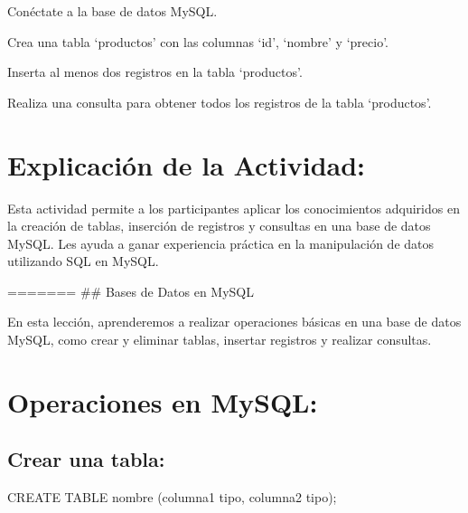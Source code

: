 \documentclass[
  a4paper,
  onepage,
  openany]{scrreprt}
\newenvironment{Shaded}{\begin{snugshade}}{\end{snugshade}}
\newcommand{\KeywordTok}[1]{\textcolor[rgb]{0.00,0.23,0.31}{#1}}
\newcommand{\NormalTok}[1]{\textcolor[rgb]{0.00,0.23,0.31}{#1}}
\begin{document}
\begin{tcolorbox}[enhanced jigsaw, breakable, opacityback=0, toptitle=1mm, coltitle=black, toprule=.15mm, rightrule=.15mm, colframe=quarto-callout-important-color-frame, opacitybacktitle=0.6, arc=.35mm, title=\textcolor{quarto-callout-important-color}{\faExclamation}\hspace{0.5em}{Actividad Práctica:}, titlerule=0mm, colbacktitle=quarto-callout-important-color!10!white, bottomtitle=1mm, bottomrule=.15mm, colback=white, left=2mm, leftrule=.75mm]

Conéctate a la base de datos MySQL.

Crea una tabla `productos' con las columnas `id', `nombre' y `precio'.

Inserta al menos dos registros en la tabla `productos'.

Realiza una consulta para obtener todos los registros de la tabla
`productos'.

\end{tcolorbox}

\hypertarget{explicaciuxf3n-de-la-actividad-72}{%
\section{Explicación de la
Actividad:}\label{explicaciuxf3n-de-la-actividad-72}}

Esta actividad permite a los participantes aplicar los conocimientos
adquiridos en la creación de tablas, inserción de registros y consultas
en una base de datos MySQL. Les ayuda a ganar experiencia práctica en la
manipulación de datos utilizando SQL en MySQL.

======= \#\# Bases de Datos en MySQL

En esta lección, aprenderemos a realizar operaciones básicas en una base
de datos MySQL, como crear y eliminar tablas, insertar registros y
realizar consultas.

\hypertarget{operaciones-en-mysql-1}{%
\section{Operaciones en MySQL:}\label{operaciones-en-mysql-1}}

\hypertarget{crear-una-tabla-3}{%
\subsection{Crear una tabla:}\label{crear-una-tabla-3}}

\begin{Shaded}
\begin{Highlighting}[]
\KeywordTok{CREATE} \KeywordTok{TABLE}\NormalTok{ nombre (columna1 tipo, columna2 tipo);}
\end{Highlighting}
\end{Shaded}
\end{document}
